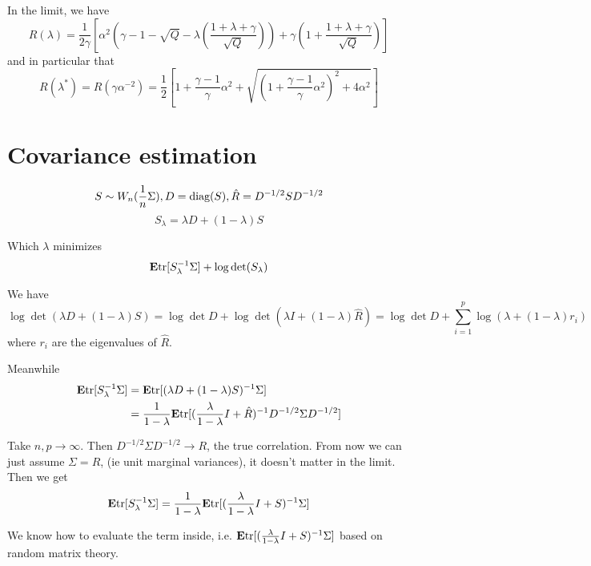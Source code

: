\documentclass[12pt]{article}
\begin{document}
In the limit, we have
\[
R(\lambda) = \frac{1}{2\gamma}\left[\alpha^2(\gamma - 1-\sqrt{Q} -\lambda\left(\frac{1 + \lambda + \gamma}{\sqrt{Q}}\right)) + \gamma\left(1 + \frac{1+\lambda+\gamma}{\sqrt{Q}}\right)\right]
\]
and in particular that
\[
R(\lambda^*) = R(\gamma\alpha^{-2}) = \frac{1}{2}\left[1 + \frac{\gamma-1}{\gamma}\alpha^2 + \sqrt{(1 + \frac{\gamma-1}{\gamma}\alpha^2)^2 + 4\alpha^2}\right]
\]

\section{Covariance estimation}

\[
S \sim W_n(\frac{1}{n}\Sigma), D = \text{diag}(S), \hat{R} = D^{-1/2}S D^{-1/2}
\]
\[
S_\lambda = \lambda D + (1-\lambda)S
\]

Which $\lambda$ minimizes
\[
\textbf{E} \text{tr}[S_\lambda^{-1} \Sigma] + \log\det(S_\lambda)
\]

We have
\[
\log\det(\lambda D + (1-\lambda)S) = \log\det D + \log\det(\lambda I + (1-\lambda)\hat{R}) = \log\det D + \sum_{i=1}^p \log (\lambda + (1-\lambda) r_i)
\]
where $r_i$ are the eigenvalues of $\hat{R}$.

Meanwhile
\begin{align*}
\textbf{E} \text{tr}[S_\lambda^{-1} \Sigma] &=
\textbf{E} \text{tr}[(\lambda D + (1-\lambda)S)^{-1}\Sigma]
\\&= 
\frac{1}{1-\lambda} \textbf{E} \text{tr}[(\frac{\lambda}{1-\lambda}I +\hat{R})^{-1}D^{-1/2}\Sigma D^{-1/2}]
\end{align*}

Take $n, p \to \infty$.  Then $D^{-1/2}\Sigma D^{-1/2} \to R$, the true correlation.  From now we can just assume $\Sigma=R$, (ie unit marginal variances), it doesn't matter in the limit.  Then we get
\[
\textbf{E} \text{tr}[S_\lambda^{-1} \Sigma] = \frac{1}{1-\lambda} \textbf{E} \text{tr}[(\frac{\lambda}{1-\lambda}I + S)^{-1} \Sigma]
\]

We know how to evaluate the term inside, i.e. $\textbf{E} \text{tr}[(\frac{\lambda}{1-\lambda}I + S)^{-1} \Sigma]$ based on random matrix theory.
\end{document}
